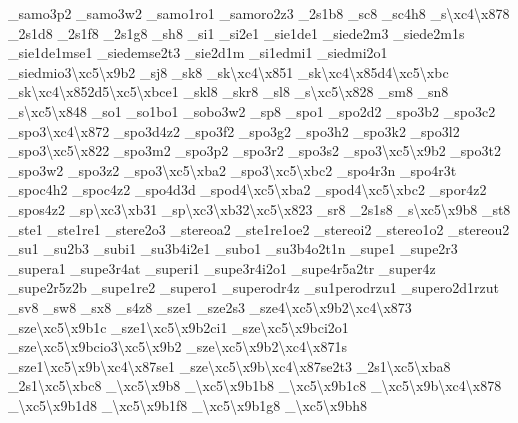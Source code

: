 {\-\_\-samo3p2 \-\_\-samo3w2 \-\_\-samo1ro1 \-\_\-samoro2z3 \-\_\-2s1b8 \-\_\-sc8 \-\_\-sc4h8 \-\_\-s\textbackslash{}xc4\textbackslash{}x878 \-\_\-2s1d8 \-\_\-2s1f8 \-\_\-2s1g8 \-\_\-sh8 \-\_\-si1 \-\_\-si2e1 \-\_\-sie1de1 \-\_\-siede2m3 \-\_\-siede2m1s \-\_\-sie1de1mse1 \-\_\-siedemse2t3 \-\_\-sie2d1m \-\_\-si1edmi1 \-\_\-siedmi2o1 \-\_\-siedmio3\textbackslash{}xc5\textbackslash{}x9b2 \-\_\-sj8 \-\_\-sk8 \-\_\-sk\textbackslash{}xc4\textbackslash{}x851 \-\_\-sk\textbackslash{}xc4\textbackslash{}x85d4\textbackslash{}xc5\textbackslash{}xbc \-\_\-sk\textbackslash{}xc4\textbackslash{}x852d5\textbackslash{}xc5\textbackslash{}xbce1 \-\_\-skl8 \-\_\-skr8 \-\_\-sl8 \-\_\-s\textbackslash{}xc5\textbackslash{}x828 \-\_\-sm8 \-\_\-sn8 \-\_\-s\textbackslash{}xc5\textbackslash{}x848 \-\_\-so1 \-\_\-so1bo1 \-\_\-sobo3w2 \-\_\-sp8 \-\_\-spo1 \-\_\-spo2d2 \-\_\-spo3b2 \-\_\-spo3c2 \-\_\-spo3\textbackslash{}xc4\textbackslash{}x872 \-\_\-spo3d4z2 \-\_\-spo3f2 \-\_\-spo3g2 \-\_\-spo3h2 \-\_\-spo3k2 \-\_\-spo3l2 \-\_\-spo3\textbackslash{}xc5\textbackslash{}x822 \-\_\-spo3m2 \-\_\-spo3p2 \-\_\-spo3r2 \-\_\-spo3s2 \-\_\-spo3\textbackslash{}xc5\textbackslash{}x9b2 \-\_\-spo3t2 \-\_\-spo3w2 \-\_\-spo3z2 \-\_\-spo3\textbackslash{}xc5\textbackslash{}xba2 \-\_\-spo3\textbackslash{}xc5\textbackslash{}xbc2 \-\_\-spo4r3n \-\_\-spo4r3t \-\_\-spoc4h2 \-\_\-spoc4z2 \-\_\-spo4d3d \-\_\-spod4\textbackslash{}xc5\textbackslash{}xba2 \-\_\-spod4\textbackslash{}xc5\textbackslash{}xbc2 \-\_\-spor4z2 \-\_\-spos4z2 \-\_\-sp\textbackslash{}xc3\textbackslash{}xb31 \-\_\-sp\textbackslash{}xc3\textbackslash{}xb32\textbackslash{}xc5\textbackslash{}x823 \-\_\-sr8 \-\_\-2s1s8 \-\_\-s\textbackslash{}xc5\textbackslash{}x9b8 \-\_\-st8 \-\_\-ste1 \-\_\-ste1re1 \-\_\-stere2o3 \-\_\-stereoa2 \-\_\-ste1re1oe2 \-\_\-stereoi2 \-\_\-stereo1o2 \-\_\-stereou2 \-\_\-su1 \-\_\-su2b3 \-\_\-subi1 \-\_\-su3b4i2e1 \-\_\-subo1 \-\_\-su3b4o2t1n \-\_\-supe1 \-\_\-supe2r3 \-\_\-supera1 \-\_\-supe3r4at \-\_\-superi1 \-\_\-supe3r4i2o1 \-\_\-supe4r5a2tr \-\_\-super4z \-\_\-supe2r5z2b \-\_\-supe1re2 \-\_\-supero1 \-\_\-superodr4z \-\_\-su1perodrzu1 \-\_\-supero2d1rzut \-\_\-sv8 \-\_\-sw8 \-\_\-sx8 \-\_\-s4z8 \-\_\-sze1 \-\_\-sze2s3 \-\_\-sze4\textbackslash{}xc5\textbackslash{}x9b2\textbackslash{}xc4\textbackslash{}x873 \-\_\-sze\textbackslash{}xc5\textbackslash{}x9b1c \-\_\-sze1\textbackslash{}xc5\textbackslash{}x9b2ci1 \-\_\-sze\textbackslash{}xc5\textbackslash{}x9bci2o1 \-\_\-sze\textbackslash{}xc5\textbackslash{}x9bcio3\textbackslash{}xc5\textbackslash{}x9b2 \-\_\-sze\textbackslash{}xc5\textbackslash{}x9b2\textbackslash{}xc4\textbackslash{}x871s \-\_\-sze1\textbackslash{}xc5\textbackslash{}x9b\textbackslash{}xc4\textbackslash{}x87se1 \-\_\-sze\textbackslash{}xc5\textbackslash{}x9b\textbackslash{}xc4\textbackslash{}x87se2t3 \-\_\-2s1\textbackslash{}xc5\textbackslash{}xba8 \-\_\-2s1\textbackslash{}xc5\textbackslash{}xbc8 \-\_\-\textbackslash{}xc5\textbackslash{}x9b8 \-\_\textbackslash{}xc5\textbackslash{}x9b1b8 \-\_\-\textbackslash{}xc5\textbackslash{}x9b1c8 \-\_\-\textbackslash{}xc5\textbackslash{}x9b\textbackslash{}xc4\textbackslash{}x878 \-\_\textbackslash{}xc5\textbackslash{}x9b1d8 \-\_\textbackslash{}xc5\textbackslash{}x9b1f8 \-\_\textbackslash{}xc5\textbackslash{}x9b1g8 \-\_\-\textbackslash{}xc5\textbackslash{}x9bh8 }
